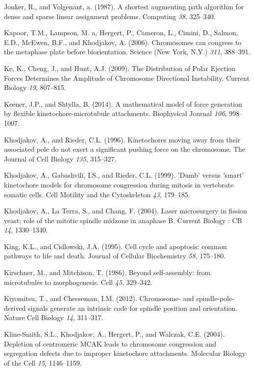 \documentclass[12pt,a4paper,twoside,openright]{book}
\begin{document}
\hypertarget{ref-Jonker1987}{}
Jonker, R., and Volgenant, a. (1987). A shortest augmenting path
algorithm for dense and sparse linear assignment problems. Computing
\emph{38}, 325--340.

\hypertarget{ref-Kapoor2006}{}
Kapoor, T.M., Lampson, M. a, Hergert, P., Cameron, L., Cimini, D.,
Salmon, E.D., McEwen, B.F., and Khodjakov, A. (2006). Chromosomes can
congress to the metaphase plate before biorientation. Science (New York,
N.Y.) \emph{311}, 388--391.

\hypertarget{ref-Ke2009}{}
Ke, K., Cheng, J., and Hunt, A.J. (2009). The Distribution of Polar
Ejection Forces Determines the Amplitude of Chromosome Directional
Instability. Current Biology \emph{19}, 807--815.

\hypertarget{ref-Keener2014}{}
Keener, J.P., and Shtylla, B. (2014). A mathematical model of force
generation by flexible kinetochore-microtubule attachments. Biophysical
Journal \emph{106}, 998--1007.

\hypertarget{ref-Khodjakov1996}{}
Khodjakov, A., and Rieder, C.L. (1996). Kinetochores moving away from
their associated pole do not exert a significant pushing force on the
chromosome. The Journal of Cell Biology \emph{135}, 315--327.

\hypertarget{ref-Khodjakov1999}{}
Khodjakov, A., Gabashvili, I.S., and Rieder, C.L. (1999). 'Dumb' versus
'smart' kinetochore models for chromosome congression during mitosis in
vertebrate somatic cells. Cell Motility and the Cytoskeleton \emph{43},
179--185.

\hypertarget{ref-Khodjakov2004}{}
Khodjakov, A., La Terra, S., and Chang, F. (2004). Laser microsurgery in
fission yeast; role of the mitotic spindle midzone in anaphase B.
Current Biology : CB \emph{14}, 1330--1340.

\hypertarget{ref-King1995}{}
King, K.L., and Cidlowski, J.A. (1995). Cell cycle and apoptosis: common
pathways to life and death. Journal of Cellular Biochemistry \emph{58},
175--180.

\hypertarget{ref-Kirschner1986}{}
Kirschner, M., and Mitchison, T. (1986). Beyond self-assembly: from
microtubules to morphogenesis. Cell \emph{45}, 329--342.

\hypertarget{ref-Kiyomitsu2012}{}
Kiyomitsu, T., and Cheeseman, I.M. (2012). Chromosome- and
spindle-pole-derived signals generate an intrinsic code for spindle
position and orientation. Nature Cell Biology \emph{14}, 311--317.

\hypertarget{ref-Kline-Smith2004}{}
Kline-Smith, S.L., Khodjakov, A., Hergert, P., and Walczak, C.E. (2004).
Depletion of centromeric MCAK leads to chromosome congression and
segregation defects due to improper kinetochore attachments. Molecular
Biology of the Cell \emph{15}, 1146--1159.
\end{document}
